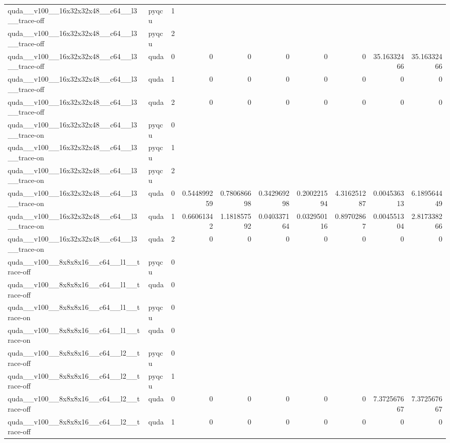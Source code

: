 \begin{table}[htbp]
\begin{tabular}{@{}llrrrrrrrr@{}}
quda\_\_v100\_\_16x32x32x48\_\_c64\_\_l3\_\_trace-off & pyqcu & 1 &  &  &  &  &  &  &  \\
quda\_\_v100\_\_16x32x32x48\_\_c64\_\_l3\_\_trace-off & pyqcu & 2 &  &  &  &  &  &  &  \\
quda\_\_v100\_\_16x32x32x48\_\_c64\_\_l3\_\_trace-off & quda & 0 & 0 & 0 & 0 & 0 & 0 & 35.16332466 & 35.16332466 \\
quda\_\_v100\_\_16x32x32x48\_\_c64\_\_l3\_\_trace-off & quda & 1 & 0 & 0 & 0 & 0 & 0 & 0 & 0 \\
quda\_\_v100\_\_16x32x32x48\_\_c64\_\_l3\_\_trace-off & quda & 2 & 0 & 0 & 0 & 0 & 0 & 0 & 0 \\
quda\_\_v100\_\_16x32x32x48\_\_c64\_\_l3\_\_trace-on & pyqcu & 0 &  &  &  &  &  &  &  \\
quda\_\_v100\_\_16x32x32x48\_\_c64\_\_l3\_\_trace-on & pyqcu & 1 &  &  &  &  &  &  &  \\
quda\_\_v100\_\_16x32x32x48\_\_c64\_\_l3\_\_trace-on & pyqcu & 2 &  &  &  &  &  &  &  \\
quda\_\_v100\_\_16x32x32x48\_\_c64\_\_l3\_\_trace-on & quda & 0 & 0.544899259 & 0.780686698 & 0.342969298 & 0.200221594 & 4.316251287 & 0.004536313 & 6.189564449 \\
quda\_\_v100\_\_16x32x32x48\_\_c64\_\_l3\_\_trace-on & quda & 1 & 0.66061342 & 1.181857592 & 0.040337164 & 0.032950116 & 0.89702867 & 0.004551304 & 2.817338266 \\
quda\_\_v100\_\_16x32x32x48\_\_c64\_\_l3\_\_trace-on & quda & 2 & 0 & 0 & 0 & 0 & 0 & 0 & 0 \\
quda\_\_v100\_\_8x8x8x16\_\_c64\_\_l1\_\_trace-off & pyqcu & 0 &  &  &  &  &  &  &  \\
quda\_\_v100\_\_8x8x8x16\_\_c64\_\_l1\_\_trace-off & quda & 0 &  &  &  &  &  &  &  \\
quda\_\_v100\_\_8x8x8x16\_\_c64\_\_l1\_\_trace-on & pyqcu & 0 &  &  &  &  &  &  &  \\
quda\_\_v100\_\_8x8x8x16\_\_c64\_\_l1\_\_trace-on & quda & 0 &  &  &  &  &  &  &  \\
quda\_\_v100\_\_8x8x8x16\_\_c64\_\_l2\_\_trace-off & pyqcu & 0 &  &  &  &  &  &  &  \\
quda\_\_v100\_\_8x8x8x16\_\_c64\_\_l2\_\_trace-off & pyqcu & 1 &  &  &  &  &  &  &  \\
quda\_\_v100\_\_8x8x8x16\_\_c64\_\_l2\_\_trace-off & quda & 0 & 0 & 0 & 0 & 0 & 0 & 7.372567667 & 7.372567667 \\
quda\_\_v100\_\_8x8x8x16\_\_c64\_\_l2\_\_trace-off & quda & 1 & 0 & 0 & 0 & 0 & 0 & 0 & 0 \\

\end{tabular}
\end{table}
